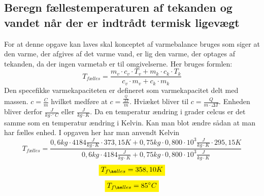 \subsection{Beregn fællestemperaturen af tekanden og vandet når der er indtrådt termisk ligevægt}
For at denne opgave kan laves skal konceptet af varmebalance bruges som siger at den varme, der afgives af 
det varme vand, er lig den varme, der optages af tekanden, da der ingen varmetab er til omgivelserne. Her 
bruges formlen:
\begin{equation*}
    T_{fælles}= \frac{m_v \cdot c_v \cdot T_v + m_k \cdot c_k \cdot T_k}{c_v \cdot m_v + c_k \cdot m_k}
\end{equation*}
Den specefikke varmekapaciteten er defineret som varmekapacitet delt med massen. \begin{math}c = \frac{C}{m}\end{math} hvilket medføre at \begin{math}c = \frac{\frac{Q}{\Delta T}}{m}\end{math}. Hviæket bliver til \begin{math}c = \frac{Q}{m \cdot \Delta T}\end{math}. Enheden bliver derfor \begin{math}\frac{J}{kg \cdot ^{\circ}C}\end{math} eller \begin{math}\frac{J}{kg \cdot K}\end{math}. Da en temperatur ændring i grader celcus er det samme som en temperatur ændring i Kelvin. Kan man blot ændre sådan at man har fælles enhed. I opgaven her har man anvendt Kelvin
\begin{equation*}
    T_{fælles}= \frac{0,6 kg \cdot 4184 \frac{J}{kg \cdot  K} \cdot 373,15 K + 0,75 kg \cdot 0,800 \cdot 10^3 \frac{J}{kg \cdot K} \cdot 295,15K}{0,6 kg \cdot 4184 \frac{J}{kg \cdot K} + 0,75 kg \cdot 0,800 \cdot 10^3 \frac{J}{kg \cdot K}}     
\end{equation*}
\begin{equation*}
    \mathcolorbox{yellow}{T_{fælles}= 358,10 K}
\end{equation*}
\begin{equation*}
\mathcolorbox{yellow}{T_{fælles}= 85^{\circ}C}
\end{equation*}

	 
    
